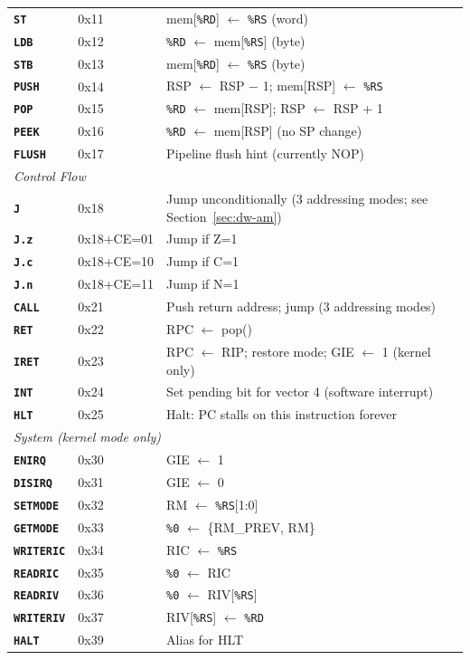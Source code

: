 \documentclass[a4paper,12pt]{report}
\newcommand{\reg}[1]{\texttt{\%#1}}
\newcommand{\instr}[1]{\texttt{\textbf{#1}}}
\begin{document}
\begin{longtable}{lll}
\instr{ST}      & 0x11 & mem[\reg{RD}] $\leftarrow$ \reg{RS} (word) \\
\instr{LDB}     & 0x12 & \reg{RD} $\leftarrow$ mem[\reg{RS}] (byte) \\
\instr{STB}     & 0x13 & mem[\reg{RD}] $\leftarrow$ \reg{RS} (byte) \\
\instr{PUSH}    & 0x14 & RSP $\leftarrow$ RSP $-$ 1; mem[RSP] $\leftarrow$ \reg{RS} \\
\instr{POP}     & 0x15 & \reg{RD} $\leftarrow$ mem[RSP]; RSP $\leftarrow$ RSP + 1 \\
\instr{PEEK}    & 0x16 & \reg{RD} $\leftarrow$ mem[RSP] (no SP change) \\
\instr{FLUSH}   & 0x17 & Pipeline flush hint (currently NOP) \\
\midrule
\multicolumn{3}{l}{\textit{Control Flow}} \\
\midrule
\instr{J}       & 0x18 & Jump unconditionally (3 addressing modes; see Section~\ref{sec:dw-am}) \\
\instr{J.z}     & 0x18+CE=01 & Jump if Z=1 \\
\instr{J.c}     & 0x18+CE=10 & Jump if C=1 \\
\instr{J.n}     & 0x18+CE=11 & Jump if N=1 \\
\instr{CALL}    & 0x21 & Push return address; jump (3 addressing modes) \\
\instr{RET}     & 0x22 & RPC $\leftarrow$ pop() \\
\instr{IRET}    & 0x23 & RPC $\leftarrow$ RIP; restore mode; GIE $\leftarrow$ 1 (kernel only) \\
\instr{INT}     & 0x24 & Set pending bit for vector 4 (software interrupt) \\
\instr{HLT}     & 0x25 & Halt: PC stalls on this instruction forever \\
\midrule
\multicolumn{3}{l}{\textit{System (kernel mode only)}} \\
\midrule
\instr{ENIRQ}   & 0x30 & GIE $\leftarrow$ 1 \\
\instr{DISIRQ}  & 0x31 & GIE $\leftarrow$ 0 \\
\instr{SETMODE} & 0x32 & RM $\leftarrow$ \reg{RS}[1:0] \\
\instr{GETMODE} & 0x33 & \reg{0} $\leftarrow$ \{RM\_PREV, RM\} \\
\instr{WRITERIC} & 0x34 & RIC $\leftarrow$ \reg{RS} \\
\instr{READRIC} & 0x35 & \reg{0} $\leftarrow$ RIC \\
\instr{READRIV} & 0x36 & \reg{0} $\leftarrow$ RIV[\reg{RS}] \\
\instr{WRITERIV} & 0x37 & RIV[\reg{RS}] $\leftarrow$ \reg{RD} \\
\instr{HALT}    & 0x39 & Alias for HLT \\
\end{longtable}
\end{document}
